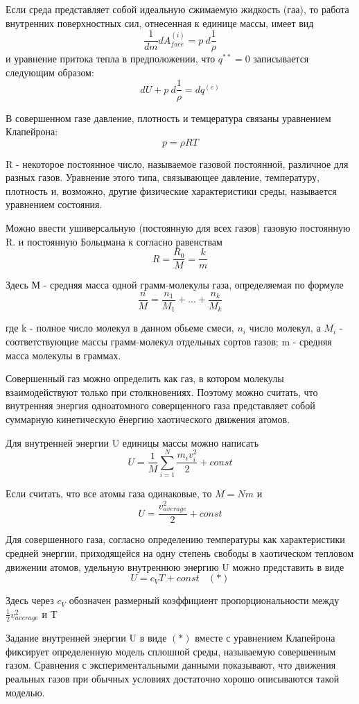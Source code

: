 Если среда представляет собой идеальную сжимаемую жидкость (гаа), то работа внутренних поверхностных сил, отнесенная к единице массы, имеет вид
$$ \frac{1}{dm}dA_{face}^{(i)} = p\ d\frac{1}{\rho} $$
и уравнение притока тепла в предположении, что $q^{**} = 0$ записывается следующим образом:
$$ dU + p\ d\frac{1}{\rho} = dq^{(e)} $$

В совершенном газе давление, плотность и темцература связаны уравнением Клапейрона:
$$ p = \rho R T $$

R - некоторое постоянное число, называемое газовой постоянной, различное для разных газов. Уравнение этого типа, связывающее давление, температуру, плотность и, возможно, другие физические характеристики среды, называется уравнением состояния.

Можно ввести ушиверсальную (постоянную для всех газов) газовую постоянную R. и постоянную Больцмана к согласно равенствам
$$ R = \frac{R_0}{M} = \frac{k}{m} $$

Здесь М - средняя масса одной грамм-молекулы газа, определяемая по формуле
$$ \frac{n}{M} = \frac{n_1}{M_1} + ... + \frac{n_k}{M_k} $$

где k - полное число молекул в данном обьеме смеси,  $n_i$ число молекул, а $M_i$ - соответствующие массы грамм-молекул отдельных сортов газов; m - средняя масса молекулы в граммах.

Совершенный газ можно определить как газ, в котором молекулы взаимодействуют только при столкновениях. Поэтому можно считать, что внутренняя энергия одноатомного соверщенного газа представляет собой суммарную кинетическую ёнергию хаотического движения атомов. 

Для внутренней энергии U единицы массы можно написать
$$ U = \frac{1}{M}\sum\limits_{i=1}^{N}\frac{m_iv_i^2}{2} + const $$

Если считать, что все атомы газа одинаковые, то $M = Nm$ и 
$$ U = \frac{v_{average}^2}{2} + const $$

Для совершенного газа, согласно определению температуры как характеристики средней энергии, приходящейся на одну степень свободы в хаотическом тепловом движении атомов, удельную внутреннюю энергию U можно представить в виде
$$ U = c_VT + const \ \ \ \ (*)$$

Здесь через $c_V$ обозначен размерный коэффициент пропорциональности между $\frac{1}{2}v_{average}^2$ и T

Задание внутренней энергии U в виде $(*)$ вместе с уравнением Клапейрона фиксирует определенную модель сплошной среды, называемую совершенным газом. Сравнения с экспериментальными данными показывают, что движения реальных газов при обычных условиях достаточно хорошо описываются такой моделью.

